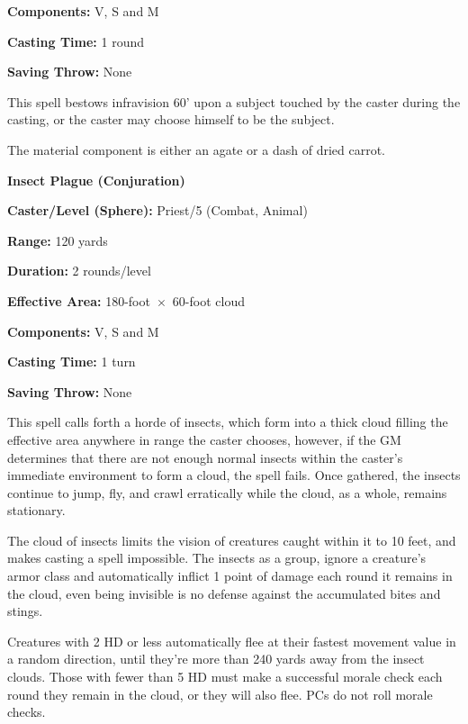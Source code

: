 \begin{multicols}{2}
\begin{minipage}{\columnwidth}
\noindent \textbf{Components:} V, S and M

\noindent \textbf{Casting Time:} 1 round

\noindent \textbf{Saving Throw:} None

\end{minipage}

This spell bestows infravision 60' upon a subject touched by the caster during the casting, or the caster may choose himself to be the subject.  

The material component is either an agate or a dash of dried carrot.

\vspace{1em}

\noindent
\begin{minipage}{\columnwidth}

\noindent \textbf{Insect Plague (Conjuration)}

\noindent \textbf{Caster/Level (Sphere):} Priest/5 (Combat, Animal)

\noindent \textbf{Range:} 120 yards

\noindent \textbf{Duration:} 2 rounds/level

\noindent \textbf{Effective Area:} 180-foot~$\times$~60-foot cloud

\noindent \textbf{Components:} V, S and M

\noindent \textbf{Casting Time:} 1 turn

\noindent \textbf{Saving Throw:} None

\end{minipage}

This spell calls forth a horde of insects, which form into a thick cloud filling the effective area anywhere in range the caster chooses, however, if the GM determines that there are not enough normal insects within the caster's immediate environment to form a cloud, the spell fails.  Once gathered, the insects continue to jump, fly, and crawl erratically while the cloud, as a whole, remains stationary.  

The cloud of insects limits the vision of creatures caught within it to 10 feet, and makes casting a spell impossible.  The insects as a group, ignore a creature's armor class and automatically inflict 1 point of damage each round it remains in the cloud, even being invisible is no defense against the accumulated bites and stings.  

Creatures with 2 HD or less automatically flee at their fastest movement value in a random direction, until they're more than 240 yards away from the insect clouds.  Those with fewer than 5 HD must make a successful morale check each round they remain in the cloud, or they will also flee.  PCs do not roll morale checks.


\end{multicols}
